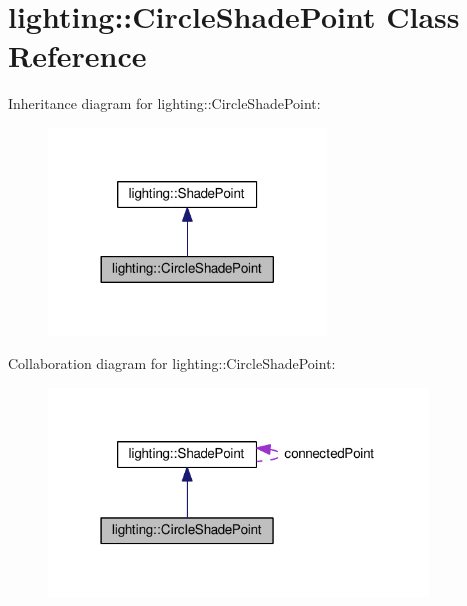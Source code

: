 \hypertarget{classlighting_1_1CircleShadePoint}{}\section{lighting\+:\+:Circle\+Shade\+Point Class Reference}
\label{classlighting_1_1CircleShadePoint}


Inheritance diagram for lighting\+:\+:Circle\+Shade\+Point\+:\nopagebreak
\begin{figure}[H]
\begin{center}
\leavevmode
\includegraphics[width=209pt]{classlighting_1_1CircleShadePoint__inherit__graph}
\end{center}
\end{figure}


Collaboration diagram for lighting\+:\+:Circle\+Shade\+Point\+:\nopagebreak
\begin{figure}[H]
\begin{center}
\leavevmode
\includegraphics[width=286pt]{classlighting_1_1CircleShadePoint__coll__graph}
\end{center}
\end{figure}

